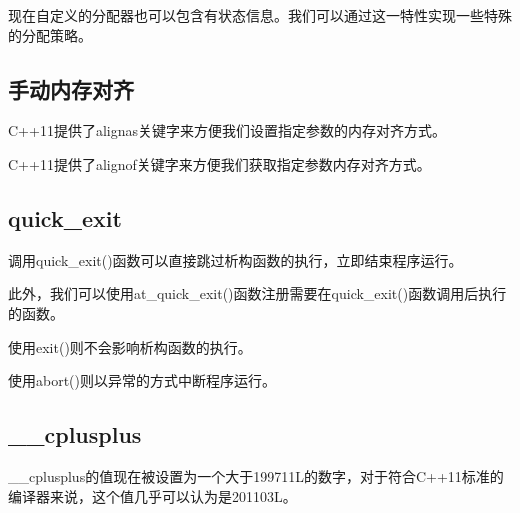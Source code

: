 \documentclass{ctexart}
\begin{document}
现在自定义的分配器也可以包含有状态信息。我们可以通过这一特性实现一些特殊的分配策略。

\subsection{手动内存对齐}

C++11提供了alignas关键字来方便我们设置指定参数的内存对齐方式。

C++11提供了alignof关键字来方便我们获取指定参数内存对齐方式。

\subsection{quick\_exit}

调用quick\_exit()函数可以直接跳过析构函数的执行，立即结束程序运行。

此外，我们可以使用at\_quick\_exit()函数注册需要在quick\_exit()函数调用后执行的函数。

使用exit()则不会影响析构函数的执行。

使用abort()则以异常的方式中断程序运行。

\subsection{\_\_cplusplus}

\_\_cplusplus的值现在被设置为一个大于199711L的数字，对于符合C++11标准的编译器来说，这个值几乎可以认为是201103L。
\end{document}
